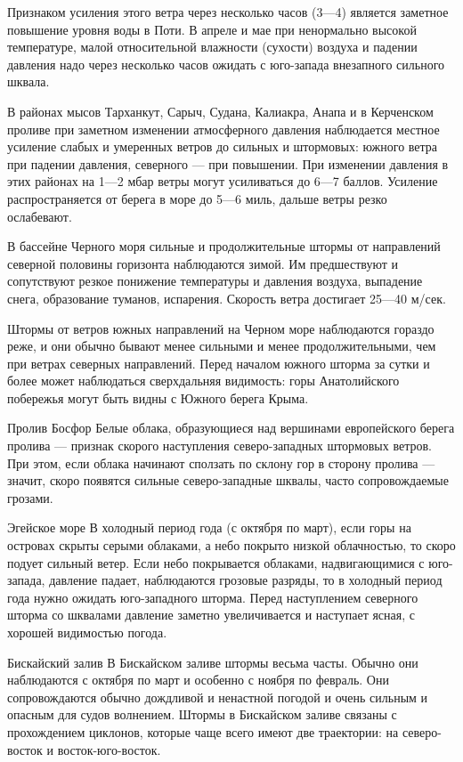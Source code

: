 Признаком усиления этого ветра через несколько часов (3—4) является заметное повышение уровня воды в Поти. В апреле и мае при ненормально высокой температуре, малой относительной влажности (сухости) воздуха и падении давления надо через несколько часов ожидать с юго-запада внезапного сильного шквала.

В районах мысов Тарханкут, Сарыч, Судана, Калиакра, Анапа и в Керченском проливе при заметном изменении атмосферного давления наблюдается местное усиление слабых и умеренных ветров до сильных и штормовых: южного ветра при падении давления, северного — при повышении. При изменении давления в этих районах на 1—2 мбар ветры могут усиливаться до 6—7 баллов. Усиление распространяется от берега в море до 5—6 миль, дальше ветры резко ослабевают.

В бассейне Черного моря сильные и продолжительные штормы от направлений северной половины горизонта наблюдаются зимой. Им предшествуют и сопутствуют резкое понижение температуры и давления воздуха, выпадение снега, образование туманов, испарения. Скорость ветра достигает 25—40 м/сек.

Штормы от ветров южных направлений на Черном море наблюдаются гораздо реже, и они обычно бывают менее сильными и менее продолжительными, чем при ветрах северных направлений. Перед началом южного шторма за сутки и более может наблюдаться сверхдальняя видимость: горы Анатолийского побережья могут быть видны с Южного берега Крыма.

Пролив Босфор
Белые облака, образующиеся над вершинами европейского берега пролива — признак скорого наступления северо-западных штормовых ветров. При этом, если облака начинают сползать по склону гор в сторону пролива — значит, скоро появятся сильные северо-западные шквалы, часто сопровождаемые грозами.

Эгейское море
В холодный период года (с октября по март), если горы на островах скрыты серыми облаками, а небо покрыто низкой облачностью, то скоро подует сильный ветер. Если небо покрывается облаками, надвигающимися с юго-запада, давление падает, наблюдаются грозовые разряды, то в холодный период года нужно ожидать юго-западного шторма. Перед наступлением северного шторма со шквалами давление заметно увеличивается и наступает ясная, с хорошей видимостью погода.

Бискайский залив
В Бискайском заливе штормы весьма часты. Обычно они наблюдаются с октября по март и особенно с ноября по февраль. Они сопровождаются обычно дождливой и ненастной погодой и очень сильным и опасным для судов волнением. Штормы в Бискайском заливе связаны с прохождением циклонов, которые чаще всего имеют две траектории: на северо-восток и восток-юго-восток.

